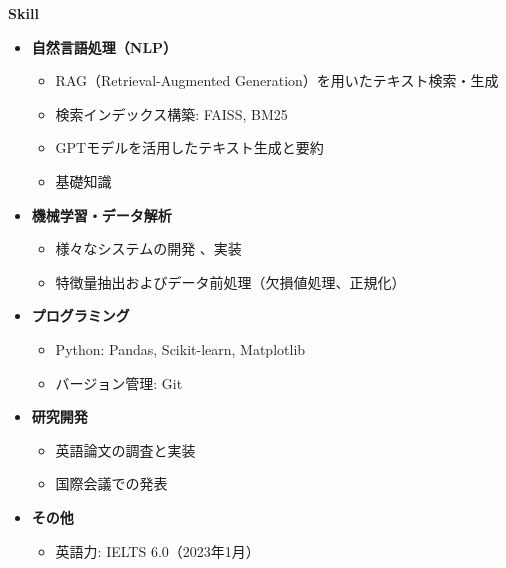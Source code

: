\documentclass[a4paper,10pt]{article}
\begin{document}
\vspace{10pt}
\noindent
\begin{minipage}[t]{0.3\textwidth}
    \textbf{Skill}
\end{minipage}%
\begin{minipage}[t]{0.7\textwidth}
 \begin{itemize}
    \item \textbf{自然言語処理（NLP）}  
    \begin{itemize}
        \item RAG（Retrieval-Augmented Generation）を用いたテキスト検索・生成  
        \item 検索インデックス構築: FAISS, BM25  
        \item GPTモデルを活用したテキスト生成と要約  
        \item 基礎知識
    \end{itemize}

    \item \textbf{機械学習・データ解析}  
    \begin{itemize}
        \item 様々なシステムの開発 、実装
        \item 特徴量抽出およびデータ前処理（欠損値処理、正規化）  
    \end{itemize}

    \item \textbf{プログラミング}  
    \begin{itemize}
        \item Python: Pandas, Scikit-learn, Matplotlib  
        \item バージョン管理: Git  
    \end{itemize}
\item \textbf{研究開発}  
    \begin{itemize}
        \item 英語論文の調査と実装  
        \item 国際会議での発表
    \end{itemize}
    
    \item \textbf{その他}  
    \begin{itemize}
        \item 英語力: IELTS 6.0（2023年1月）  
    \end{itemize}
\end{itemize}
\end{minipage}

\vspace{10pt}
\end{document}
